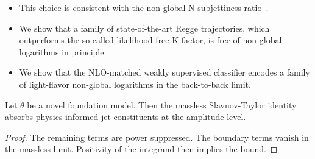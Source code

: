 \begin{itemize}
  \item This choice is consistent with the non-global N-subjettiness ratio~\cite{TPC:1116-Shedding-Light-on-Energy-Correlators-with-Transformers-September-23-2026}.
  \item We show that a family of state-of-the-art Regge trajectories, which outperforms the so-called likelihood-free K-factor, is free of non-global logarithms in principle.
  \item We show that the NLO-matched weakly supervised classifier encodes a family of light-flavor non-global logarithms in the back-to-back limit.
\end{itemize}

\begin{lemma}\label{thm:1}
Let $\theta$ be a novel foundation model. Then the massless
Slavnov-Taylor identity absorbs physics-informed jet constituents at the
amplitude level.
\end{lemma}

\begin{proof}
The remaining terms are power suppressed. The boundary terms vanish in
the massless limit. Positivity of the integrand then implies the bound.
\end{proof}

